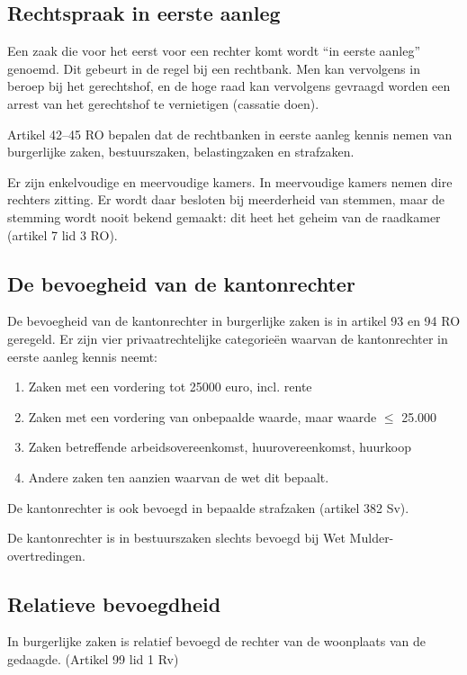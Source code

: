 \documentclass{article}
\begin{document}
\subsection{Rechtspraak in eerste aanleg}

Een zaak die voor het eerst voor een rechter komt wordt ``in eerste aanleg''
genoemd. Dit gebeurt in de regel bij een rechtbank. Men kan vervolgens in
beroep bij het gerechtshof, en de hoge raad kan vervolgens gevraagd worden een
arrest van het gerechtshof te vernietigen (cassatie doen). 

Artikel 42--45 RO bepalen dat de rechtbanken in eerste aanleg kennis nemen van
burgerlijke zaken, bestuurszaken, belastingzaken en strafzaken.

Er zijn enkelvoudige en meervoudige kamers. In meervoudige kamers nemen dire
rechters zitting. Er wordt daar besloten bij meerderheid van stemmen, maar de
stemming wordt nooit bekend gemaakt: dit heet het geheim van de raadkamer
(artikel 7 lid 3 RO).

\subsection{De bevoegheid van de kantonrechter}

De bevoegheid van de kantonrechter in burgerlijke zaken is in artikel 93 en 94 RO
geregeld. Er zijn vier privaatrechtelijke categorieën waarvan de kantonrechter in eerste aanleg kennis
neemt: 

\begin{enumerate}
  \item Zaken met een vordering tot 25000 euro, incl. rente
  \item Zaken met een vordering van onbepaalde waarde, maar waarde $\leq$ 25.000
  \item Zaken betreffende arbeidsovereenkomst, huurovereenkomst, huurkoop
  \item Andere zaken ten aanzien waarvan de wet dit bepaalt.
\end{enumerate}

De kantonrechter is ook bevoegd in bepaalde strafzaken (artikel 382 Sv).

De kantonrechter is in bestuurszaken slechts bevoegd bij Wet Mulder-overtredingen.

\subsection{Relatieve bevoegdheid}

In burgerlijke zaken is relatief bevoegd de rechter van de woonplaats van de
gedaagde. (Artikel 99 lid 1 Rv)
\end{document}
